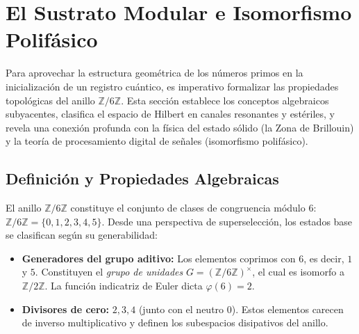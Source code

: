 \documentclass[12pt,a4paper]{article}
\theoremstyle{plain}
\theoremstyle{definition}
\theoremstyle{remark}
\begin{document}
\section{El Sustrato Modular e Isomorfismo Polifásico}
\label{sec:sustrato_modular}

Para aprovechar la estructura geométrica de los números primos en la inicialización de un registro cuántico, es imperativo formalizar las propiedades topológicas del anillo $\mathbb{Z}/6\mathbb{Z}$. Esta sección establece los conceptos algebraicos subyacentes, clasifica el espacio de Hilbert en canales resonantes y estériles, y revela una conexión profunda con la física del estado sólido (la Zona de Brillouin) y la teoría de procesamiento digital de señales (isomorfismo polifásico).

\subsection{Definición y Propiedades Algebraicas}

El anillo $\mathbb{Z}/6\mathbb{Z}$ constituye el conjunto de clases de congruencia módulo 6: $\mathbb{Z}/6\mathbb{Z} = \{0,1,2,3,4,5\}$. Desde una perspectiva de superselección, los estados base se clasifican según su generabilidad:
\begin{itemize}
    \item \textbf{Generadores del grupo aditivo:} Los elementos coprimos con 6, es decir, $1$ y $5$. Constituyen el \textit{grupo de unidades} $G = (\mathbb{Z}/6\mathbb{Z})^{\times}$, el cual es isomorfo a $\mathbb{Z}/2\mathbb{Z}$. La función indicatriz de Euler dicta $\varphi(6)=2$.
    \item \textbf{Divisores de cero:} $2,3,4$ (junto con el neutro $0$). Estos elementos carecen de inverso multiplicativo y definen los subespacios disipativos del anillo.
\end{itemize}
\end{document}
